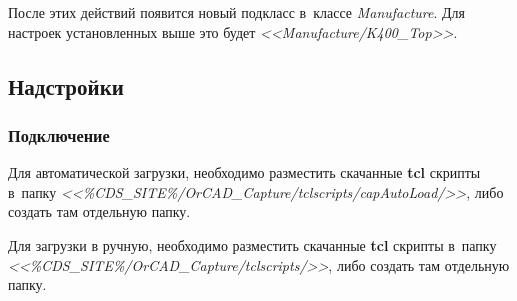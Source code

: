 После этих действий появится новый подкласс в~классе \textit{Manufacture}. Для настроек установленных выше это будет \textit{<<Manufacture/K400\_Top>>}.


\newpage
\subsection{Надстройки} \label{ssec:variant_list} \label{ssec:cis_plugin}



\subsubsection{Подключение} \label{sssec:cis_plugin_setup}

Для автоматической загрузки, необходимо разместить скачанные \textbf{tcl} скрипты в~папку \textit{<<\%CDS\_SITE\%/OrCAD\_Capture/tclscripts/capAutoLoad/>>}, либо создать там отдельную папку.

Для загрузки в ручную, необходимо разместить скачанные \textbf{tcl} скрипты в~папку \textit{<<\%CDS\_SITE\%/OrCAD\_Capture/tclscripts/>>}, либо создать там отдельную папку.


